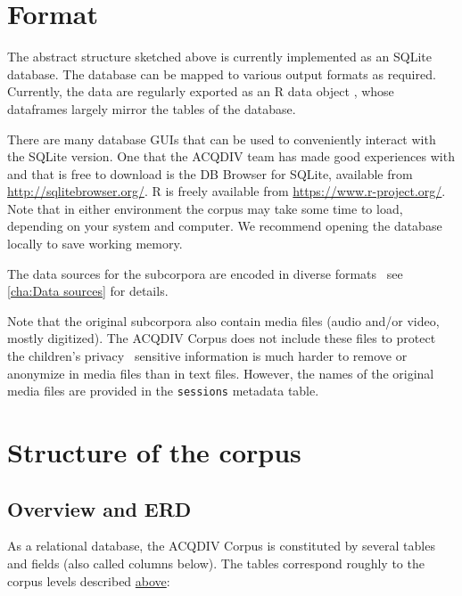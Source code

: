 \documentclass[a4paper, 11pt]{book}
\begin{document}
\section{Format}
\label{sec:Format}

The abstract structure sketched above is currently implemented as an SQLite database. The database can be mapped to various output formats as required. Currently, the data are regularly exported as an R data object \citep{RCoreTeam2015}, whose dataframes largely mirror the tables of the database. 

There are many database GUIs that can be used to conveniently interact with the SQLite version. One that the ACQDIV team has made good experiences with and that is free to download is the DB Browser for SQLite, available from \url{http://sqlitebrowser.org/}. R is freely available from \url{https://www.r-project.org/}. Note that in either environment the corpus may take some time to load, depending on your system and computer. We recommend opening the database locally to save working memory. 

The data sources for the subcorpora are encoded in diverse formats \textendash\ see \autoref{cha:Data sources} for details. 

Note that the original subcorpora also contain media files (audio and/or video, mostly digitized). The ACQDIV Corpus does not include these files to protect the children’s privacy \textendash\ sensitive information is much harder to remove or anonymize in media files than in text files. However, the names of the original media files are provided in the \texttt{sessions} metadata table. 


\section{Structure of the corpus}
\label{sec:Structure of the corpus}

\subsection{Overview and ERD}

As a relational database, the ACQDIV Corpus is constituted by several tables and fields (also called columns below). The tables correspond roughly to the corpus levels described \hyperref[sec:Architecture]{above}: 
\end{document}
